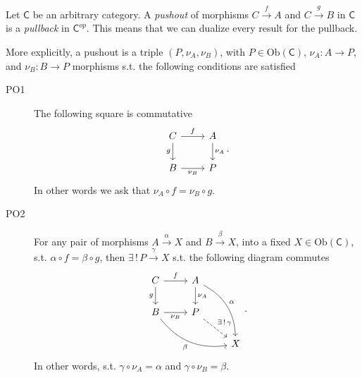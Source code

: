 \begin{defn}[Pushout]
	Let $\mathsf{C}$ be an arbitrary category.
	A {\em pushout} of morphisms $C \xrightarrow{f} A$ and $C \xrightarrow{g} B$ in $\mathsf{C}$ is a {\em pullback} in $\mathsf{C}^{op}$.
	This means that we can dualize every result for the pullback.

	More explicitly, a pushout is a triple $ \left(P, \nu_A, \nu_B \right)$, with $P \in \mathrm{Ob} \left(\mathsf{C}\right)$, $\nu_A: A \to P$,  and $\nu_B: B \to P$ morphisms s.t. the following conditions are satisfied
	\begin{description}
		\item[PO1] The following square is commutative
			\begin{equation}
			\begin{tikzcd}
				C \arrow[r, "f", rightarrow] \arrow[d, "g"', rightarrow] &
				A \arrow[d, "\nu_A", rightarrow] \\
				B \arrow[r, "\nu_B"', rightarrow] &
				P
			\end{tikzcd}
			.\end{equation} 
			In other words we ask that $\nu_A \circ f = \nu_B \circ g$.
		\item[PO2] For any pair of morphisms $A \xrightarrow{\alpha} X$ and $B \xrightarrow{\beta} X$, into a fixed $X \in \mathrm{Ob} \left(\mathsf{C}\right)$, s.t. $\alpha \circ f = \beta \circ g$, then
			$\exists\, !\, P \xrightarrow{\gamma} X$ s.t. the following diagram commutes
			\begin{equation}
			\begin{tikzcd}
				C \arrow[r, "f", rightarrow] \arrow[d, "g"', rightarrow] &
				A \arrow[d, "\nu_A", rightarrow] \arrow[rdd, "\alpha", rightarrow, bend left] & \\
				B \arrow[r, "\nu_B"', rightarrow] \arrow[rrd, "\beta"', rightarrow, bend right] &
				P \arrow[rd, "\exists\, !\, \gamma", dashrightarrow] & \\
				& & X
			\end{tikzcd}
			.\end{equation} 			
			In other words, s.t. $\gamma \circ \nu_A = \alpha$ and $\gamma \circ \nu_B = \beta$.
	\end{description} 
\end{defn}
		
